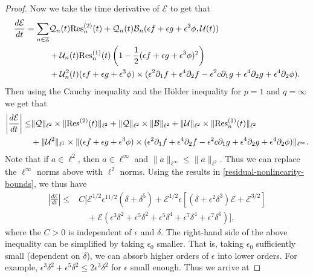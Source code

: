 \begin{proof}
	Now we take the time derivative of \(\mathcal E\) to get that 
	\begin{equation*}
	\begin{aligned}
		\frac{d\mathcal{E}}{dt} = \sum_{n \in \mathbb{Z}} &\mathcal Q_n(t) \mathrm{Res}_n^{(2)}(t) + \mathcal Q_n(t) 	\mathcal B_n(\epsilon f + \epsilon g + \epsilon^3 \phi, \mathcal U(t)) \\
		&+ \mathcal U_n(t) \mathrm{Res}_n^{(1)}(t) \left( 1 - \frac 12 (\epsilon f+ \epsilon g + \epsilon^3 \phi)^2  \right) \\
		&+ \mathcal U_n^2(t)(\epsilon f + \epsilon g + \epsilon^3 \phi) \times (\epsilon^2\partial_1 f + \epsilon^4\partial_2 f -\epsilon^2 c \partial_1 g + \epsilon^4 \partial_2 g + \epsilon^4 \partial_2 \phi).
	\end{aligned}
	\end{equation*}
	Then using the Cauchy inequality and the H\"older inequality for \(p=1\) and \(q=\infty\) we get that
	\begin{equation*}
	\begin{aligned}
		\left| \frac{d\mathcal E}{dt} \right| \leq& \| \mathcal Q \|_{\ell^2 }\times \|\mathrm{Res}^{(2)}(t) \|_{\ell^2} + \| \mathcal Q \|_{\ell^2} \times \| \mathcal B \|_{\ell^2}  + \|\mathcal U \|_{\ell^2} \times \| \mathrm{Res}_n^{(1)}(t) \|_{\ell^2}\\
		& + \|\mathcal U^2 \|_{\ell^1} \times  \| (\epsilon f+ \epsilon g + \epsilon^3 \phi)  \times  (\epsilon^2\partial_1 f + \epsilon^4\partial_2 f -\epsilon^2 c \partial_1 g + \epsilon^4 \partial_2 g + \epsilon^4 \partial_2 \phi )\|_{\ell^\infty} .
	\end{aligned}
	\end{equation*}
	Note that if \(a \in \ell^2\), then \(a\in \ell^\infty\) and \(\|a\|_{\ell^\infty} \leq \|a \|_{\ell^2}\). Thus we can replace the \(\ell^\infty\) norms above with \(\ell^2\) norms. Using the results in \cref{residual-nonlinearity-bounds}, we thus have 
	\begin{equation*}
	\begin{aligned}
		\left| \frac{d\mathcal E}{dt} \right| \leq& C\Big[\mathcal E^{1/2} \epsilon^{11/2}(\delta + \delta^5) + \mathcal E^{1/2}\epsilon [(\delta + \epsilon^2 \delta^3)\mathcal E + \mathcal E^{3/2}]  \\
		&\quad + \mathcal E(\epsilon^3 \delta^2 + \epsilon^5\delta^2 + \epsilon^5 \delta^4 + \epsilon^7\delta^4 + \epsilon^7 \delta^6) \Big],
	\end{aligned}
	\end{equation*}
 	where the \(C>0\) is independent of \(\epsilon\) and \(\delta\). The right-hand side of the above inequality can be simplified by taking \(\epsilon_0\) smaller. That is, taking \(\epsilon_0\) sufficiently small (dependent on \(\delta\)), we can absorb higher orders of \(\epsilon\) into lower orders. For example, \(\epsilon^3 \delta^2 + \epsilon^5\delta^2 \leq 2 \epsilon^3 \delta^2\) for \(\epsilon\) small enough. Thus we arrive at  		

\end{proof}
